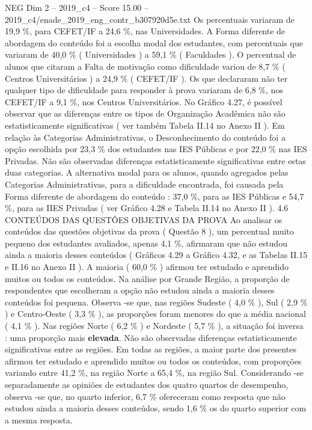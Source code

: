 \begin{textsample}{NEG Dim 2 – 2019\_c4 – Score 15.00 – 2019\_c4/enade\_2019\_eng\_contr\_b307920d5e.txt}
Os percentuais variaram de 19,9 \%, para CEFET/IF a 24,6 \%, nas Universidades.
A Forma diferente de abordagem do conteúdo foi a escolha modal dos estudantes, com percentuais que variaram de 40,0 \% ( Universidades ) a 59,1 \% ( Faculdades ).
O percentual de alunos que citaram a Falta de motivação como dificuldade variou de 8,7 \% ( Centros Universitários ) a 24,9 \% ( CEFET/IF ).
Os que declararam não ter qualquer tipo de dificuldade para responder à prova variaram de 6,8 \%, nos CEFET/IF a 9,1 \%, nos Centros Universitários.
No Gráfico 4.27, é possível observar que as diferenças entre os tipos de Organização Acadêmica não são estatisticamente significativas ( ver também Tabela II.14 no Anexo II ).
Em relação às Categorias Administrativas, o Desconhecimento do conteúdo foi a opção escolhida por 23,3 \% dos estudantes nas IES Públicas e por 22,0 \% nas IES Privadas.
Não são observadas diferenças estatisticamente significativas entre estas duas categorias.
A alternativa modal para os alunos, quando agregados pelas Categorias Administrativas, para a dificuldade encontrada, foi causada pela Forma diferente de abordagem do conteúdo : 37,0 \%, para as IES Públicas e 54,7 \%, para as IIES Privadas ( ver Gráfico 4.28 e Tabela II.14 no Anexo II ). 4.6 CONTEÚDOS DAS QUESTÕES OBJETIVAS DA PROVA Ao analisar os conteúdos das questões objetivas da prova ( Questão 8 ), um percentual muito pequeno dos estudantes avaliados, apenas 4,1 \%, afirmaram que não estudou ainda a maioria desses conteúdos ( Gráficos 4.29 a Gráfico 4.32, e as Tabelas II.15 e II.16 no Anexo II ).
A maioria ( 60,0 \% ) afirmou ter estudado e aprendido muitos ou todos os conteúdos.
Na análise por Grande Região, a proporção de respondentes que escolheram a opção não estudou ainda a maioria desses conteúdos foi pequena.
Observa -se que, nas regiões Sudeste ( 4,0 \% ), Sul ( 2,9 \% ) e Centro-Oeste ( 3,3 \% ), as proporções foram menores do que a média nacional ( 4,1 \% ).
Nas regiões Norte ( 6,2 \% ) e Nordeste ( 5,7 \% ), a situação foi inversa : uma proporção mais \textbf{elevada}.
Não são observadas diferenças estatisticamente significativas entre as regiões.
Em todas as regiões, a maior parte dos presentes afirmou ter estudado e aprendido muitos ou todos os conteúdos, com proporções variando entre 41,2 \%, na região Norte a 65,4 \%, na região Sul.
Considerando -se separadamente as opiniões de estudantes dos quatro quartos de desempenho, observa -se que, no quarto inferior, 6,7 \% ofereceram como resposta que não estudou ainda a maioria desses conteúdos, sendo 1,6 \% os do quarto superior com a mesma resposta.

\end{textsample}
